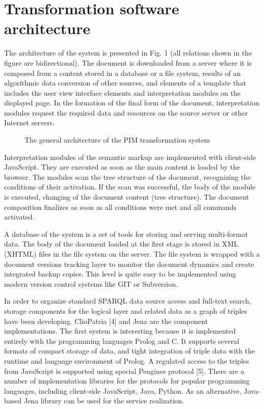 \documentclass[conference,a4paper]{IEEEtran}
\begin{document}
\section{Transformation software architecture}
\label{sec:arch}

The architecture of the system is presented in Fig. 1 (all relations shown in the figure are bidirectional). The document is downloaded from a server where it is composed from a content stored in a database or a file system, results of an algorithmic data conversion of other sources, and elements of a template that includes the user view interface elements and interpretation modules on the displayed page. In the formation of the final form of the document, interpretation modules request the required data and resources on the source server or other Internet servers.

\begin{figure}[t]
  \centering
  \caption{The general architecture of the PIM transformation system}
  \label{fig:arch}
\end{figure}


Interpretation modules of the semantic markup are implemented with client-side JavaScript. They are executed as soon as the main content is loaded by the browser. The modules scan the tree structure of the document, recognizing the conditions of their activation. If the scan was successful, the body of the module is executed, changing of the document content (tree structure). The document composition finalizes as soon as all conditions were met and all commands activated.

A database of the system is a set of tools for storing and serving multi-format data. The body of the document loaded at the first stage is stored in XML (XHTML) files in the file system on the server. The file system is wrapped with a document versions tracking layer to monitor the document dynamics and create integrated backup copies. This level is quite easy to be implemented using modern version control systems like GIT or Subversion.

In order to organize standard SPARQL data source access and full-text search, storage components for the logical layer and related data as a graph of triples have been developing. ClioPatria [4] and Jena are the component implementations. The first system is interesting because it is implemented entirely with the programming languages Prolog and C. It supports several formats of compact storage of data, and tight integration of triple data with the runtime and language environment of Prolog. A regulated access to the triples from JavaScript is supported using special Pengines protocol [5]. There are a number of implementation libraries for the protocols for popular programming languages, including client-side JavaScript, Java, Python. As an alternative, Java-based Jena library can be used for the service realization.
\end{document}
